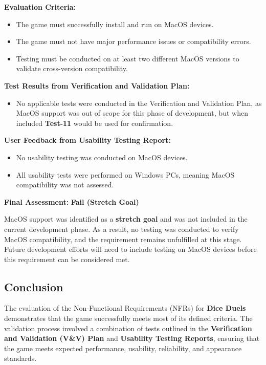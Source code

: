 \documentclass[12pt, titlepage]{article}
\begin{document}
\textbf{Evaluation Criteria:}  
\begin{itemize}
    \item The game must successfully install and run on MacOS devices.
    \item The game must not have major performance issues or compatibility errors.
    \item Testing must be conducted on at least two different MacOS versions to validate cross-version compatibility.
\end{itemize}

\textbf{Test Results from Verification and Validation Plan:}  
\begin{itemize}
    \item No applicable tests were conducted in the Verification and Validation Plan, as MacOS support was out of scope for this phase of development, but when included \textbf{Test-11} would be used for confirmation.
\end{itemize}

\textbf{User Feedback from Usability Testing Report:}  
\begin{itemize}
    \item No usability testing was conducted on MacOS devices.
    \item All usability tests were performed on Windows PCs, meaning MacOS compatibility was not assessed.
\end{itemize}

\textbf{Final Assessment:} \textbf{Fail (Stretch Goal)}  

MacOS support was identified as a \textbf{stretch goal} and was not included in the current development phase. As a result, no testing was conducted to verify MacOS compatibility, and the requirement remains unfulfilled at this stage. Future development efforts will need to include testing on MacOS devices before this requirement can be considered met.


\subsection{Conclusion}

The evaluation of the Non-Functional Requirements (NFRs) for \textbf{Dice Duels} demonstrates that the game successfully meets most of its defined criteria. The validation process involved a combination of tests outlined in the \textbf{Verification and Validation (V\&V) Plan} and \textbf{Usability Testing Reports}, ensuring that the game meets expected performance, usability, reliability, and appearance standards.
\end{document}
